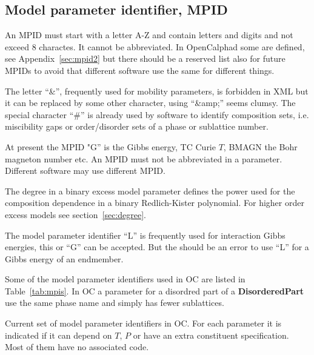 \documentclass{article}
\begin{document}
\begin{appendices}
{\begin{verbatim}
\end{verbatim}
}

\subsection{Model parameter identifier, MPID}\label{sec:mpid}\label{sec:mpid2}

An MPID must start with a letter A-Z and contain letters and digits
and not exceed 8 charactes.  It cannot be abbreviated.  In
OpenCalphad some are defined, see Appendix~\ref{sec:mpid2} but there
should be a reserved list also for future MPIDs to avoid that
different software use the same for different things.
  
The letter ``\&'', frequently used for mobility parameters, is
forbidden in XML but it can be replaced by some other character, using
``\&amp;'' seems clumsy.  The special character ``\#'' is already used
by software to identify composition sets, i.e. miscibility gaps or
order/disorder sets of a phase or sublattice number.

At present the MPID "G'' is the Gibbs energy, TC Curie $T$, BMAGN the
Bohr magneton number etc.  An MPID must not be abbreviated in a
parameter.  Different software may use different MPID.

The degree in a binary excess model parameter defines the power used
for the composition dependence in a binary Redlich-Kister polynomial.
For higher order excess models see section~\ref{sec:degree}.

The model parameter identifier ``L'' is frequently used for
interaction Gibbs energies, this or ``G'' can be accepted.  But the
should be an error to use ``L'' for a Gibbs energy of an endmember.

Some of the model parameter identifiers used in OC are listed in
Table~\ref{tab:mpis}.  In OC a parameter for a disordred part of a
{\bf DisorderedPart} use the same phase name and simply has fewer
sublattices.

\begin{table}[!h]
  \caption{Current set of model parameter identifiers in OC.  For each
    parameter it is indicated if it can depend on $T$, $P$ or have an
    extra constituent specification.  Most of them have no associated
    code.}\label{tab:mpis}


\end{table}
\end{appendices}
\end{document}
